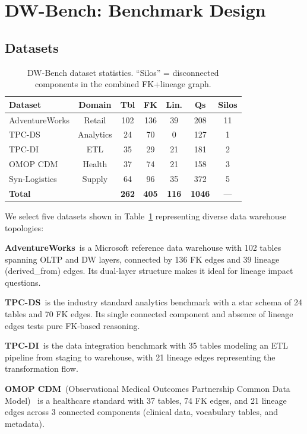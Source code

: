 \section{DW-Bench: Benchmark Design}

\subsection{Datasets}

\begin{table}[t]
\centering
\caption{DW-Bench dataset statistics. ``Silos'' = disconnected
components in the combined FK+lineage graph.}
\label{tab:datasets}
\small
\begin{tabular}{@{}lcccccc@{}}
\toprule
Dataset & Domain & Tbl & FK & Lin. & Qs & Silos \\
\midrule
AdventureWorks & Retail   & 102 & 136 & 39 & 208 & 11 \\
TPC-DS         & Analytics&  24 &  70 &  0 & 127 &  1 \\
TPC-DI         & ETL      &  35 &  29 & 21 & 181 &  2 \\
OMOP CDM       & Health   &  37 &  74 & 21 & 158 &  3 \\
Syn-Logistics  & Supply   &  64 &  96 & 35 & 372 &  5 \\
\midrule
\textbf{Total} &          & \textbf{262} & \textbf{405} & \textbf{116} & \textbf{1046} & --- \\
\bottomrule
\end{tabular}
\end{table}

We select five datasets shown in Table~\ref{tab:datasets} representing diverse data warehouse topologies:

\textbf{AdventureWorks}~is a Microsoft reference data warehouse with 102
tables spanning OLTP and DW layers, connected by 136 FK edges and 39
lineage (derived\_from) edges. Its dual-layer structure makes it ideal for
lineage impact questions.

\textbf{TPC-DS}~is the industry standard analytics benchmark with a star
schema of 24 tables and 70 FK edges. Its single connected component and
absence of lineage edges tests pure FK-based reasoning.

\textbf{TPC-DI}~is the data integration benchmark with 35 tables modeling
an ETL pipeline from staging to warehouse, with 21 lineage edges
representing the transformation flow.

\textbf{OMOP CDM}~(Observational Medical Outcomes Partnership Common Data
Model)~\cite{ohdsi2019omop} is a healthcare standard with 37 tables, 74
FK edges, and 21 lineage edges across 3 connected components (clinical
data, vocabulary tables, and metadata).

